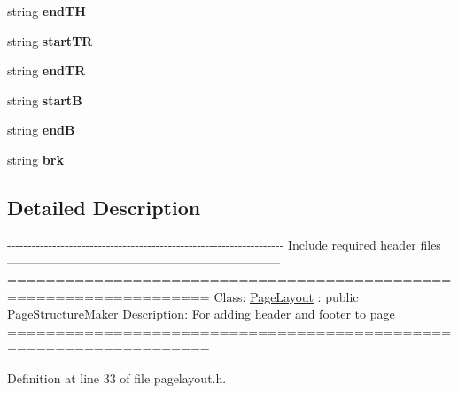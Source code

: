 \begin{DoxyCompactItemize}
\item 
\hypertarget{classPageStructureMaker_aa244b4ef71850dc76fcfb5157bcaf8fc}{string {\bfseries end\-T\-H}}\label{classPageStructureMaker_aa244b4ef71850dc76fcfb5157bcaf8fc}

\item 
\hypertarget{classPageStructureMaker_aa59b4949d26fab5a72710fa9fc3e8ea9}{string {\bfseries start\-T\-R}}\label{classPageStructureMaker_aa59b4949d26fab5a72710fa9fc3e8ea9}

\item 
\hypertarget{classPageStructureMaker_afee49ebdcbc0971142fcf7eae8baa306}{string {\bfseries end\-T\-R}}\label{classPageStructureMaker_afee49ebdcbc0971142fcf7eae8baa306}

\item 
\hypertarget{classPageStructureMaker_aa0f624b485f07f6e19151b1df3dc59a3}{string {\bfseries start\-B}}\label{classPageStructureMaker_aa0f624b485f07f6e19151b1df3dc59a3}

\item 
\hypertarget{classPageStructureMaker_ad46c3195310a1f0226e21d2eb5befb00}{string {\bfseries end\-B}}\label{classPageStructureMaker_ad46c3195310a1f0226e21d2eb5befb00}

\item 
\hypertarget{classPageStructureMaker_a63911cb925ccdc6c879905a677ed8881}{string {\bfseries brk}}\label{classPageStructureMaker_a63911cb925ccdc6c879905a677ed8881}

\end{DoxyCompactItemize}


\subsection{Detailed Description}
-\/-\/-\/-\/-\/-\/-\/-\/-\/-\/-\/-\/-\/-\/-\/-\/-\/-\/-\/-\/-\/-\/-\/-\/-\/-\/-\/-\/-\/-\/-\/-\/-\/-\/-\/-\/-\/-\/-\/-\/-\/-\/-\/-\/-\/-\/-\/-\/-\/-\/-\/-\/-\/-\/-\/-\/-\/-\/-\/-\/-\/-\/-\/-\/-\/-\/-\/ Include required header files ------------------------------------------------------------------ =================================================================== Class\-: \hyperlink{classPageLayout}{Page\-Layout} \-: public \hyperlink{classPageStructureMaker}{Page\-Structure\-Maker} Description\-: For adding header and footer to page =================================================================== 

Definition at line 33 of file pagelayout.\-h.



